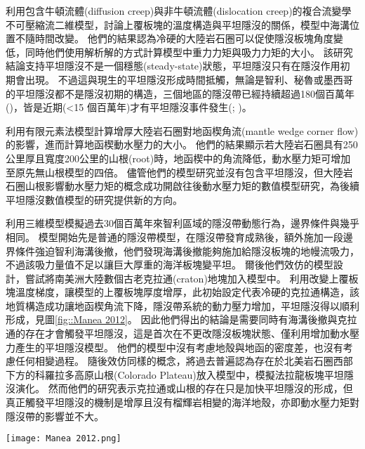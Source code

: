 \citealp{Thermal2012}利用包含牛頓流體(diffusion creep)與非牛頓流體(dislocation creep)的複合流變學不可壓縮流二維模型，討論上覆板塊的溫度構造與平坦隱沒的關係，模型中海溝位置不隨時間改變。
他們的結果認為冷硬的大陸岩石圈可以促使隱沒板塊角度變低，同時他們使用解析解的方式計算模型中重力力矩與吸力力矩的大小。
該研究結論支持平坦隱沒不是一個穩態(steady-state)狀態，平坦隱沒只有在隱沒作用初期會出現。
不過這與現生的平坦隱沒形成時間抵觸，無論是智利、秘魯或墨西哥的平坦隱沒都不是隱沒初期的構造，三個地區的隱沒帶已經持續超過180個百萬年(\citealp{Schellart2021})，皆是近期(<15 個百萬年)才有平坦隱沒事件發生(\citealp{chen2019southward}; \citealp{hu2021southward})。

\citealp{o2009subduction}利用有限元素法模型計算增厚大陸岩石圈對地函楔角流(mantle wedge corner flow)的影響，進而計算地函楔動水壓力的大小。
他們的結果顯示若大陸岩石圈具有250公里厚且寬度200公里的山根(root)時，地函楔中的角流降低，動水壓力矩可增加至原先無山根模型的四倍。
儘管他們的模型研究並沒有包含平坦隱沒，但大陸岩石圈山根影響動水壓力矩的概念成功開啟往後動水壓力矩的數值模型研究，為後續平坦隱沒數值模型的研究提供新的方向。

\citealp{Manea2012Chile}利用三維模型模擬過去30個百萬年來智利區域的隱沒帶動態行為，邊界條件與\citealp{Thermal2012}幾乎相同。
模型開始先是普通的隱沒帶模型，在隱沒帶發育成熟後，額外施加一段邊界條件強迫智利海溝後撤，他們發現海溝後撤能夠施加給隱沒板塊的地幔流吸力，不過該吸力量值不足以讓巨大厚重的海洋板塊變平坦。
爾後他們效仿\citealp{o2009subduction}的模型設計，嘗試將南美洲大陸數個古老克拉通(craton)地塊加入模型中。
利用改變上覆板塊溫度梯度，讓模型的上覆板塊厚度增厚，此初始設定代表冷硬的克拉通構造，該地質構造成功讓地函楔角流下降，隱沒帶系統的動力壓力增加，平坦隱沒得以順利形成，見圖\ref{fig::Manea 2012}。
因此他們得出的結論是需要同時有海溝後撤與克拉通的存在才會觸發平坦隱沒，這是首次在不更改隱沒板塊狀態、僅利用增加動水壓力產生的平坦隱沒模型。
他們的模型中沒有考慮地殼與地函的密度差，也沒有考慮任何相變過程。
隨後\citealp{Liu2016}效仿同樣的概念，將過去普遍認為存在於北美岩石圈西部下方的科羅拉多高原山根(Colorado Plateau)放入模型中，模擬法拉龍板塊平坦隱沒演化。
然而他們的研究表示克拉通或山根的存在只是加快平坦隱沒的形成，但真正觸發平坦隱沒的機制是增厚且沒有榴輝岩相變的海洋地殼，亦即動水壓力矩對隱沒帶的影響並不大。
\begin{figure*}[ht!]
    \centering
    \texttt{[image: Manea 2012.png]}
    \caption[\citealp{Manea2012Chile}中的智利平坦隱沒模型]{\citealp{Manea2012Chile}中的智利平坦隱沒模型，模型中同時加入海溝後撤邊界條件與增厚大陸岩石圈可以讓平坦隱沒發育。
    }
    \label{fig::Manea 2012}
\end{figure*}

